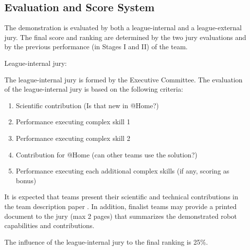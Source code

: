 \subsection{Evaluation and Score System}
The demonstration is evaluated by both a league-internal and a league-external jury. The final score and ranking are determined by the two jury evaluations and by the previous performance (in Stages I and II) of the team.

\begin{enumerate}
  {\bf\item League-internal jury:} The league-internal jury is formed by the Executive Committee.
  The evaluation of the league-internal jury is based on the following criteria:
  \begin{enumerate}
    \item Scientific contribution (Is that new in @Home?)
    \item Performance executing complex skill 1
    \item Performance executing complex skill 2
    \item Contribution for @Home (can other teams use the solution?)
    \item Performance executing each additional complex skills (if any, scoring as bonus)

  \end{enumerate}
  It is expected that teams present their scientific and technical contributions in
  the team description paper .
  In addition, finalist teams may provide a printed document to the jury (max 2 pages) that summarizes the demonstrated robot capabilities and contributions.

  The influence of the league-internal jury to the final ranking is 25\%. \\


\end{enumerate}
